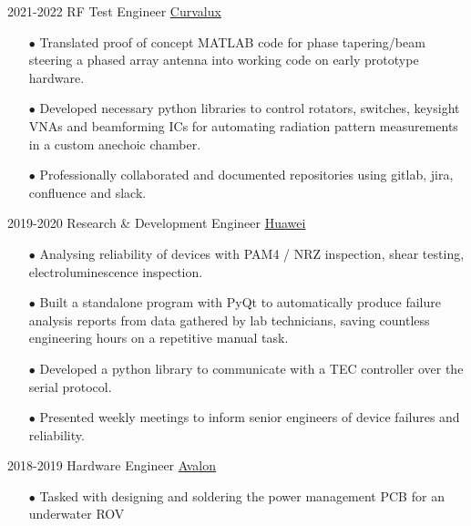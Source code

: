 \documentclass[9pt]{developercv} %
\begin{document}
	\begin{entrylist}
		\entry
			{2021-2022}
			{RF Test Engineer}
			{\href{https://Curvalux.com}{Curvalux}}
			{	
				\begin{itemize}
					\item[$\bullet$\hspace*{0.5cm}] Translated proof of concept MATLAB code for phase tapering/beam steering a phased array antenna into working code on early prototype hardware.
					\item[$\bullet$\hspace*{0.5cm}] Developed necessary python libraries to control rotators, switches, keysight VNAs and beamforming ICs for automating radiation pattern measurements in a custom anechoic chamber.
					\item[$\bullet$\hspace*{0.5cm}] Professionally collaborated and documented repositories using gitlab, jira, confluence and slack.
				\end{itemize}
			}
		\entry
			{2019-2020}
			{Research \& Development Engineer}
			{\href{https://www.huawei.com/uk/contact-us}{Huawei}}
			{
				\begin{itemize}
					\item[$\bullet$\hspace*{0.5cm}] Analysing reliability of devices with PAM4 / NRZ inspection, shear testing, electroluminescence inspection.
					\item[$\bullet$\hspace*{0.5cm}] Built a standalone program with PyQt to automatically produce failure analysis reports from data gathered by lab technicians, saving countless engineering hours on a repetitive manual task.
					\item[$\bullet$\hspace*{0.5cm}] Developed a python library to communicate with a TEC controller over the serial protocol.
					\item[$\bullet$\hspace*{0.5cm}] Presented weekly meetings to inform senior engineers of device failures and reliability.
				\end{itemize}
			}
			\entry
			{2018-2019}
			{Hardware Engineer}
			{\href{https://avalonrov.wixsite.com/avalonrov}{Avalon}}
			{
				\begin{itemize}
					\item[$\bullet$\hspace*{0.5cm}] Tasked with designing and soldering the power management PCB for an underwater ROV

\end{itemize}}
\end{entrylist}
\end{document}

